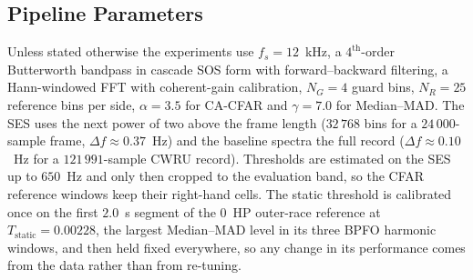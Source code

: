 \subsection{Pipeline Parameters}
Unless stated otherwise the experiments use $f_s=12$~kHz, a
$4^{\text{th}}$-order Butterworth bandpass in cascade SOS form with
forward--backward filtering, a Hann-windowed FFT with coherent-gain calibration,
$N_G=4$ guard bins, $N_R=25$ reference bins per side, $\alpha=3.5$ for CA-CFAR
and $\gamma=7.0$ for Median--MAD. The SES uses the next power of two above the
frame length ($32\,768$ bins for a $24\,000$-sample frame, $\Delta
f\approx0.37$~Hz) and the baseline spectra the full record ($\Delta
f\approx0.10$~Hz for a $121\,991$-sample CWRU record). Thresholds are estimated
on the SES up to $650$~Hz and only then cropped to the evaluation band, so the
CFAR reference windows keep their right-hand cells. The static threshold is
calibrated once on the first $2.0$~s segment of the $0$~HP outer-race reference
at $T_{\text{static}}=0.00228$, the largest Median--MAD level in its three BPFO
harmonic windows, and then held fixed everywhere, so any change in its
performance comes from the data rather than from re-tuning.
